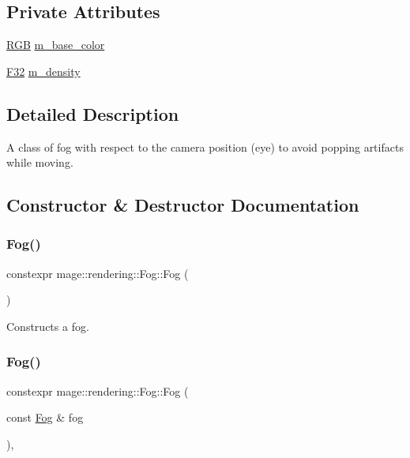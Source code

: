 \subsection*{Private Attributes}
\begin{DoxyCompactItemize}
\item 
\hyperlink{structmage_1_1_r_g_b}{R\+GB} \hyperlink{classmage_1_1rendering_1_1_fog_a5f7d0bcb79a1d68b2456bd005db48a99}{m\+\_\+base\+\_\+color}
\item 
\hyperlink{namespacemage_aa97e833b45f06d60a0a9c4fc22ae02c0}{F32} \hyperlink{classmage_1_1rendering_1_1_fog_aa7a402ad9eef0e9916bb9f83751ebe32}{m\+\_\+density}
\end{DoxyCompactItemize}


\subsection{Detailed Description}
A class of fog with respect to the camera position (eye) to avoid popping artifacts while moving. 

\subsection{Constructor \& Destructor Documentation}
\hypertarget{classmage_1_1rendering_1_1_fog_a48489b0ce940aff4395eb5ea88394081}{}\label{classmage_1_1rendering_1_1_fog_a48489b0ce940aff4395eb5ea88394081} 
\subsubsection{\texorpdfstring{Fog()}{Fog()}\hspace{0.1cm}{\footnotesize\ttfamily [1/3]}}
{\footnotesize\ttfamily constexpr mage\+::rendering\+::\+Fog\+::\+Fog (\begin{DoxyParamCaption}{ }\end{DoxyParamCaption})\hspace{0.3cm}{\ttfamily [noexcept]}}

Constructs a fog. \hypertarget{classmage_1_1rendering_1_1_fog_a2f730d70ed426468f113d44e7810394b}{}\label{classmage_1_1rendering_1_1_fog_a2f730d70ed426468f113d44e7810394b} 
\subsubsection{\texorpdfstring{Fog()}{Fog()}\hspace{0.1cm}{\footnotesize\ttfamily [2/3]}}
{\footnotesize\ttfamily constexpr mage\+::rendering\+::\+Fog\+::\+Fog (\begin{DoxyParamCaption}\item[{const \hyperlink{classmage_1_1rendering_1_1_fog}{Fog} \&}]{fog }\end{DoxyParamCaption})\hspace{0.3cm}{\ttfamily [default]}, {\ttfamily [noexcept]}}


